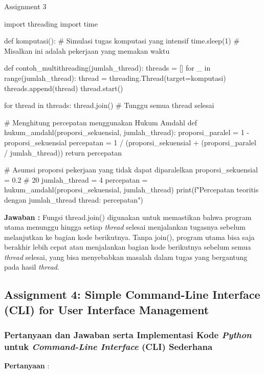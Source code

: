 \documentclass[12pt]{article}
\begin{document}
\begin{python}
Assignment 3

import threading
import time

def komputasi():
    # Simulasi tugas komputasi yang intensif
    time.sleep(1)  # Misalkan ini adalah pekerjaan yang memakan waktu

def contoh_multithreading(jumlah_thread):
    threads = []
    for _ in range(jumlah_thread):
        thread = threading.Thread(target=komputasi)
        threads.append(thread)
        thread.start()
    
    for thread in threads:
        thread.join()  # Tunggu semua thread selesai

# Menghitung percepatan menggunakan Hukum Amdahl
def hukum_amdahl(proporsi_sekuensial, jumlah_thread):
    proporsi_paralel = 1 - proporsi_sekuensial
    percepatan = 1 / (proporsi_sekuensial + (proporsi_paralel / jumlah_thread))
    return percepatan

# Asumsi proporsi pekerjaan yang tidak dapat diparalelkan
proporsi_sekuensial = 0.2  # 20%
jumlah_thread = 4
percepatan = hukum_amdahl(proporsi_sekuensial, jumlah_thread)
print(f"Percepatan teoritis dengan {jumlah_thread} thread: {percepatan}")
\end{python}

\textbf{Jawaban :} Fungsi thread.join() digunakan untuk memastikan bahwa program utama menunggu hingga setiap \textit{thread} selesai menjalankan tugasnya sebelum melanjutkan ke bagian kode berikutnya. Tanpa join(), program utama bisa saja berakhir lebih cepat atau menjalankan bagian kode berikutnya sebelum semua \textit{thread} selesai, yang bisa menyebabkan masalah dalam tugas yang bergantung pada hasil \textit{thread}.


\subsection{Assignment 4: Simple Command-Line Interface (CLI) for User Interface Management}

\subsubsection{Pertanyaan dan Jawaban serta Implementasi Kode \textit{Python} untuk \textit{Command-Line Interface} (CLI) Sederhana}

\textbf{Pertanyaan} :
\end{document}
